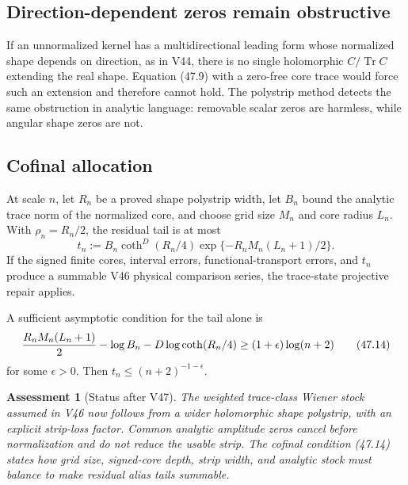 \documentclass[11pt]{article}
\newtheorem{assessment}[theorem]{Assessment}
\theoremstyle{remark}
\begin{document}
\subsection{Direction-dependent zeros remain obstructive}

If an unnormalized kernel has a multidirectional leading form whose
normalized shape depends on direction, as in V44, there is no single
holomorphic \(C/\operatorname{Tr}C\) extending the real shape.
Equation (47.9) with a zero-free core trace would force such an
extension and therefore cannot hold.  The polystrip method detects
the same obstruction in analytic language: removable scalar zeros
are harmless, while angular shape zeros are not.

\subsection{Cofinal allocation}

At scale \(n\), let \(R_n\) be a proved shape polystrip width,
let \(B_n\) bound the analytic trace norm of the normalized core, and
choose grid size \(M_n\) and core radius \(L_n\).  With
\(\rho_n=R_n/2\), the residual tail is at most
\begin{equation}
 t_n:=
 B_n
 \coth^D(R_n/4)
 \exp\{-R_nM_n(L_n+1)/2\}.                       \tag{47.13}
\end{equation}
If the signed finite cores, interval errors, functional-transport
errors, and \(t_n\) produce a summable V46 physical comparison
series, the trace-state projective repair applies.

A sufficient asymptotic condition for the tail alone is
\begin{equation}
 {R_nM_n(L_n+1)\over2}
 -
 \log B_n
 -
 D\log\coth(R_n/4)
 \geq(1+\epsilon)\log(n+2)                       \tag{47.14}
\end{equation}
for some \(\epsilon>0\).  Then \(t_n\leq(n+2)^{-1-\epsilon}\).

\begin{assessment}[Status after V47]
\label{ass:v12v47-status}
The weighted trace-class Wiener stock assumed in V46 now follows
from a wider holomorphic shape polystrip, with an explicit
strip-loss factor.  Common analytic amplitude zeros cancel before
normalization and do not reduce the usable strip.  The cofinal
condition (47.14) states how grid size, signed-core depth, strip
width, and analytic stock must balance to make residual alias tails
summable.
\end{assessment}
\end{document}
